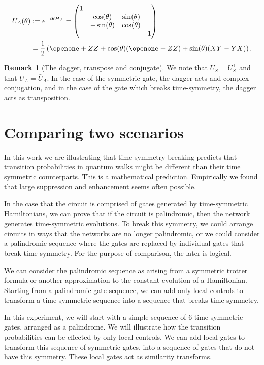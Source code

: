\documentclass[aps,pra,12pt,nofootinbib,superscriptaddress,longbibliography,showpacs]{revtex4-1}
\theoremstyle{plain}
\theoremstyle{definition}
\newtheorem{remark}[theorem]{Remark}
\newcommand{\I}{\openone}     %
\begin{document}
\begin{align}
\notag
U_A(\theta) &:= e^{-i \theta H_A}
= 
\begin{pmatrix}
1\\
& \cos(\theta) &  \sin(\theta)\\
& -\sin(\theta) & \cos(\theta)\\
& & & 1
\end{pmatrix}\\
&= \frac{1}{2}\left(\I +ZZ +\cos(\theta)(\I-ZZ) + \sin(\theta)(XY-YX)\right).
\end{align}

\begin{remark}[The dagger, transpose and conjugate] 
We note that $U_S=U_S^\top$ and that $U_A=\bar{U}_A$. In the case of the
symmetric gate, the dagger acts and complex conjugation, and in the case of the
gate which breaks time-symmetry, the dagger acts as transposition.  
\end{remark} 




\section{Comparing two scenarios} 

In this work we are illustrating that time symmetry breaking predicts that
transition probabilities in quantum walks might be different than their time
symmetric counterparts. This is a mathematical prediction.  Empirically we found
that large suppression and enhancement seems often possible.  

In the case that the circuit is comprised of gates generated by time-symmetric
Hamiltonians, we can prove that if the circuit is palindromic, then the network
generates time-symmetric evolutions.  To break this symmetry, we could arrange
circuits in ways that the networks are no longer palindromic, or we could
consider a palindromic sequence where the gates are replaced by individual gates
that break time symmetry.  For the purpose of comparison, the later is logical.
 

We can consider the palindromic sequence as arising from a symmetric trotter
formula or another approximation to the constant evolution of a Hamiltonian. 
Starting from a palindromic gate sequence, we can add only local controls to
transform a time-symmetric sequence into a sequence that breaks time symmetry.

In this experiment, we will start with a simple sequence of 6 time symmetric
gates, arranged as a palindrome.  We will illustrate how the transition
probabilities can be effected by only local controls.  We can add local gates to
transform this sequence of symmetric gates, into a sequence of gates that do not
have this symmetry.  These local gates act as similarity transforms.  
\end{document}
